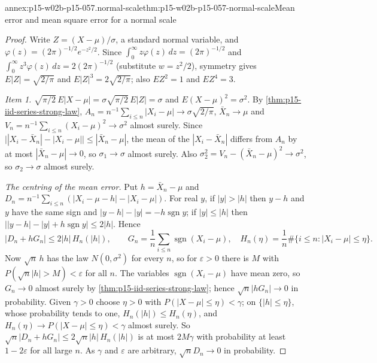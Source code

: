 \begin{annexitem}{annex:p15-w02b-p15-057.normal-scale}{thm:p15-w02b-p15-057-normal-scale}{Mean error and mean square error for a normal scale}
\begin{proof}
Write \(Z=(X-\mu)/\sigma\), a standard normal variable, and
\(\varphi(z)=(2\pi)^{-1/2}e^{-z^2/2}\). Since
\(\int_0^\infty z\varphi(z)\,dz=(2\pi)^{-1/2}\) and
\(\int_0^\infty z^3\varphi(z)\,dz=2(2\pi)^{-1/2}\) (substitute
\(w=z^2/2\)), symmetry gives \(E|Z|=\sqrt{2/\pi}\) and
\(E|Z|^3=2\sqrt{2/\pi}\); also \(EZ^2=1\) and \(EZ^4=3\).

\emph{Item 1.} \(\sqrt{\pi/2}\,E|X-\mu|=\sigma\sqrt{\pi/2}\,E|Z|=\sigma\)
and \(E(X-\mu)^2=\sigma^2\). By \cref{thm:p15-iid-series-strong-law},
\(A_n=n^{-1}\sum_{i\leq n}|X_i-\mu|\to\sigma\sqrt{2/\pi}\),
\(\bar X_n\to\mu\) and \(V_n=n^{-1}\sum_{i\leq n}(X_i-\mu)^2\to\sigma^2\)
almost surely. Since \(\bigl||X_i-\bar X_n|-|X_i-\mu|\bigr|\leq|\bar
X_n-\mu|\), the mean of the \(|X_i-\bar X_n|\) differs from \(A_n\) by at
most \(|\bar X_n-\mu|\to0\), so \(\sigma_1\to\sigma\) almost surely. Also
\(\sigma_2^2=V_n-(\bar X_n-\mu)^2\to\sigma^2\), so \(\sigma_2\to\sigma\)
almost surely.

\emph{The centring of the mean error.} Put \(h=\bar X_n-\mu\) and
\(D_n=n^{-1}\sum_{i\leq n}(|X_i-\mu-h|-|X_i-\mu|)\). For real \(y\), if
\(|y|>|h|\) then \(y-h\) and \(y\) have the same sign and
\(|y-h|-|y|=-h\operatorname{sgn}y\); if \(|y|\leq|h|\) then
\(\bigl||y-h|-|y|+h\operatorname{sgn}y\bigr|\leq2|h|\). Hence
\[
 |D_n+hG_n|\leq2|h|\,H_n(|h|),\qquad
 G_n=\frac1n\sum_{i\leq n}\operatorname{sgn}(X_i-\mu),\quad
 H_n(\eta)=\frac1n\#\{i\leq n:|X_i-\mu|\leq\eta\}.
\]
Now \(\sqrt n\,h\) has the law \(N(0,\sigma^2)\) for every \(n\), so for
\(\varepsilon>0\) there is \(M\) with \(P(\sqrt n|h|>M)<\varepsilon\) for
all \(n\). The variables \(\operatorname{sgn}(X_i-\mu)\) have mean zero, so
\(G_n\to0\) almost surely by \cref{thm:p15-iid-series-strong-law}; hence
\(\sqrt n|hG_n|\to0\) in probability. Given \(\gamma>0\) choose
\(\eta>0\) with \(P(|X-\mu|\leq\eta)<\gamma\); on \(\{|h|\leq\eta\}\),
whose probability tends to one, \(H_n(|h|)\leq H_n(\eta)\), and
\(H_n(\eta)\to P(|X-\mu|\leq\eta)<\gamma\) almost surely. So
\(\sqrt n|D_n+hG_n|\leq2\sqrt n|h|\,H_n(|h|)\) is at most \(2M\gamma\)
with probability at least \(1-2\varepsilon\) for all large \(n\). As
\(\gamma\) and \(\varepsilon\) are arbitrary, \(\sqrt n D_n\to0\) in
probability.


\end{proof}
\end{annexitem}
